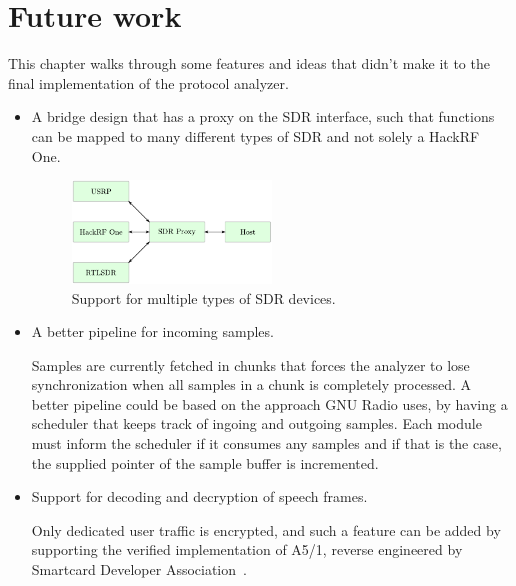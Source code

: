 \chapter{Future work}
\label{cha:future_work}
This chapter walks through some features and ideas that didn't make it
to the final implementation of the protocol analyzer.

\begin{itemize}
\item A bridge design that has a proxy on the \gls{SDR} interface,
  such that functions can be mapped to many different types of
  \gls{SDR} and not solely a HackRF One.
\begin{figure}[H]
  \centering
  \includegraphics[width=0.5\textwidth]{figures/device_host_usb_interface_fw}
  \caption{Support for multiple types of \gls{SDR} devices.}
  \label{fig:device_host_usb_interface_fw}
\end{figure}
\item A better pipeline for incoming samples.

  Samples are currently fetched in chunks that forces the analyzer to
  lose synchronization when all samples in a chunk is completely
  processed. A better pipeline could be based on the approach GNU
  Radio uses, by having a scheduler that keeps track of ingoing and
  outgoing samples. Each module must inform the scheduler if it
  consumes any samples and if that is the case, the supplied pointer
  of the sample buffer is incremented.

\item Support for decoding and decryption of speech frames.

  Only dedicated user traffic is encrypted, and such a feature can be
  added by supporting the verified implementation of A5/1, reverse
  engineered by Smartcard Developer Association~\cite{a51decryption}.


\end{itemize}
